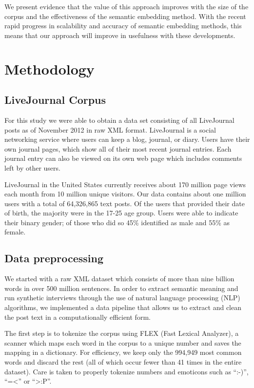 \documentclass{sigchi}
\begin{document}
We present evidence that the value of this approach improves with the size of the corpus and the
effectiveness of the semantic embedding method. With the recent rapid progress in scalability and
accuracy of semantic embedding methods, this means that our approach will improve in usefulness
with these developments. 


\section{Methodology}

\subsection{LiveJournal Corpus}
For this study we were able to obtain a data set consisting of all LiveJournal posts as of November 2012 in raw XML format. LiveJournal is a social networking service where users can keep a blog, journal, or diary. Users have their own journal pages, which show all of their most recent journal entries. Each journal entry can also be viewed on its own web page which includes comments left by other users. 

LiveJournal in the United States currently receives about 170 million page views each month from 10 million unique visitors. Our data contains about one million users with a total of 64,326,865 text posts. Of the users that provided their date of birth, the majority were in the 17-25 age group. Users were able to indicate their binary gender; of those who did so 45\% identified as male and 55\% as female. 

\subsection{Data preprocessing}

We started with a raw XML dataset which consists of more than nine billion words in over 500 million sentences. In order to extract semantic meaning and run synthetic interviews through the use of natural language processing (NLP) algorithms, we implemented a data pipeline that allows us to extract and clean the post text in a computationally efficient form. 

The first step is to tokenize the corpus using FLEX (Fast Lexical Analyzer), a scanner which maps each word in the corpus to a unique number and saves the mapping in a dictionary. For efficiency, we keep only the 994,949 most common words and discard the rest (all of which occur fewer than 41 times in the entire dataset). Care is taken to properly tokenize numbers and emoticons such as ``:-)'', ``=<'' or ``>:P''.
\end{document}
